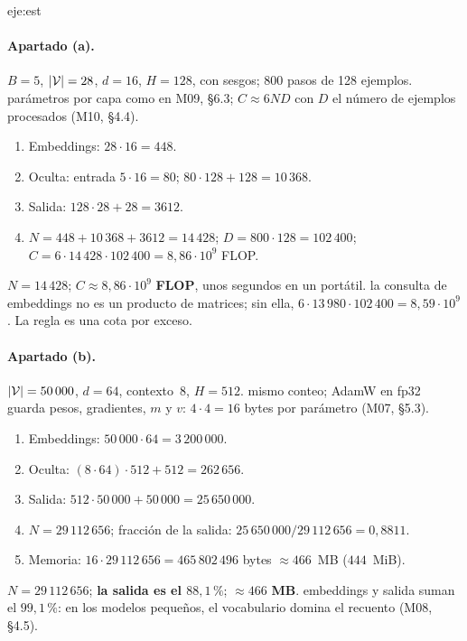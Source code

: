 \begin{solucion}{eje:est}
\paragraph{Apartado (a).}
\datos $B=5$, $\lvert\mathcal{V}\rvert=28$, $d=16$, $H=128$, con sesgos; 800 pasos de 128 ejemplos.
\planteamiento parámetros por capa como en M09, §6.3; $C\approx 6ND$ con $D$ el número de ejemplos procesados (M10, §4.4).
\pasos
\begin{enumerate}[label=\arabic*.]
  \item Embeddings: $28\cdot 16=448$.
  \item Oculta: entrada $5\cdot 16=80$; $80\cdot 128+128=10\,368$.
  \item Salida: $128\cdot 28+28=3612$.
  \item $N=448+10\,368+3612=14\,428$; $D=800\cdot 128=102\,400$; $C=6\cdot 14\,428\cdot 102\,400=8{,}86\cdot 10^{9}$ FLOP.
\end{enumerate}
\resultado $N=14\,428$; $C\approx 8{,}86\cdot 10^{9}$ \textbf{FLOP}, unos segundos en un portátil.
\comprobacion la consulta de embeddings no es un producto de matrices; sin ella, $6\cdot 13\,980\cdot 102\,400=8{,}59\cdot 10^{9}$. La regla es una cota por exceso.

\paragraph{Apartado (b).}
\datos $\lvert\mathcal{V}\rvert=50\,000$, $d=64$, contexto~8, $H=512$.
\planteamiento mismo conteo; AdamW en fp32 guarda pesos, gradientes, $m$ y $v$: $4\cdot 4=16$ bytes por parámetro (M07, §5.3).
\pasos
\begin{enumerate}[label=\arabic*.]
  \item Embeddings: $50\,000\cdot 64=3\,200\,000$.
  \item Oculta: $(8\cdot 64)\cdot 512+512=262\,656$.
  \item Salida: $512\cdot 50\,000+50\,000=25\,650\,000$.
  \item $N=29\,112\,656$; fracción de la salida: $25\,650\,000/29\,112\,656=0{,}8811$.
  \item Memoria: $16\cdot 29\,112\,656=465\,802\,496$ bytes $\approx 466$~MB ($444$~MiB).
\end{enumerate}
\resultado $N=29\,112\,656$; \textbf{la salida es el $88{,}1\,\%$}; $\approx 466$ \textbf{MB}.
\comprobacion embeddings y salida suman el $99{,}1\,\%$: en los modelos pequeños, el vocabulario domina el recuento (M08, §4.5).


\end{solucion}
